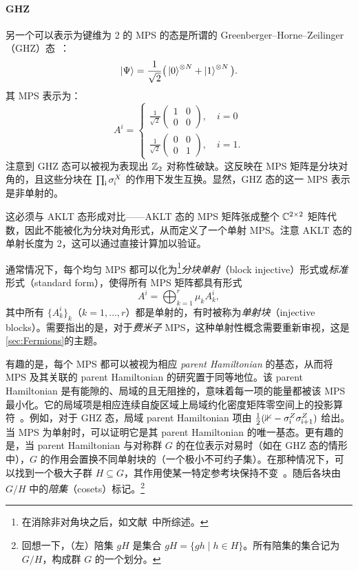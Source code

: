 \paragraph{GHZ} 另一个可以表示为键维为 2 的 MPS 的态是所谓的 Greenberger–Horne–Zeilinger（GHZ）态~\cite{Greenberger1989}：
\begin{equation}
    \ket{\Psi} = \frac{1}{\sqrt{2}} \big( \ket{0}^{\otimes N} + \ket{1}^{\otimes N} \big).
\end{equation}
其 MPS 表示为：
\begin{equation}
    A^i =
    \begin{cases}
        \frac{1}{\sqrt{2}}\begin{pmatrix} 1 & 0 \\ 0 & 0\end{pmatrix}, \quad i=0 \\
        \frac{1}{\sqrt{2}}\begin{pmatrix} 0 & 0 \\ 0 & 1\end{pmatrix}, \quad i=1.
    \end{cases}
\end{equation}
注意到 GHZ 态可以被视为表现出 $\mathbb Z_2$ 对称性破缺。这反映在 MPS 矩阵是分块对角的，且这些分块在 $\prod_\mathsf i \sigma^X_\mathsf i$ 的作用下发生互换。显然，GHZ 态的这一 MPS 表示是非单射的。

这必须与 AKLT 态形成对比——AKLT 态的 MPS 矩阵张成整个 $\mathbb C^{2\times 2}$ 矩阵代数，因此不能被化为分块对角形式，从而定义了一个单射 MPS。注意 AKLT 态的单射长度为 2，这可以通过直接计算加以验证。

通常情况下，每个均匀 MPS 都可以化为\footnote{在消除非对角块之后，如文献~\cite{Cirac2020}中所综述。}\emph{分块单射}（block injective）形式或\emph{标准}形式（standard form），使得所有 MPS 矩阵都具有形式~\cite{PerezGarcia2006,Cadarso2012}
\begin{equation}
    A^i = \bigoplus_{k=1}^r \mu_k A_k^i,
\end{equation}
其中所有 $\{A^i_k\}_k$（$k=1,\dots,r$）都是单射的，有时被称为\emph{单射块}（injective blocks）。需要指出的是，对于\emph{费米子} MPS，这种单射性概念需要重新审视，这是\cref{sec:Fermions}的主题。

有趣的是，每个 MPS 都可以被视为相应 \emph{parent Hamiltonian} 的基态，从而将 MPS 及其关联的 parent Hamiltonian 的研究置于同等地位。该 parent Hamiltonian 是有能隙的、局域的且无阻挫的，意味着每一项的能量都被该 MPS 最小化。它的局域项是相应连续自旋区域上局域约化密度矩阵零空间上的投影算符~\cite{PerezGarcia2006,Cirac2020}。例如，对于 GHZ 态，局域 parent Hamiltonian 项由 $\frac{1}{2}(\mathbb 1 - \sigma^Z_{\mathsf i}\sigma^Z_{\mathsf i+1})$ 给出。当 MPS 为单射时，可以证明它是其 parent Hamiltonian 的唯一基态。更有趣的是，当 parent Hamiltonian 与对称群 $G$ 的在位表示对易时（如在 GHZ 态的情形中），$G$ 的作用会置换不同单射块的（一个极小不可约子集）。在那种情况下，可以找到一个极大子群 $H\subseteq G$，其作用使某一特定参考块保持不变~\cite{Schuch2011}。随后各块由 $G/H$ 中的\emph{陪集}（cosets）标记。\footnote{回想一下，（左）陪集 $gH$ 是集合 $gH=\{gh \mid h\in H\}$。所有陪集的集合记为 $G/H$，构成群 $G$ 的一个划分。}

